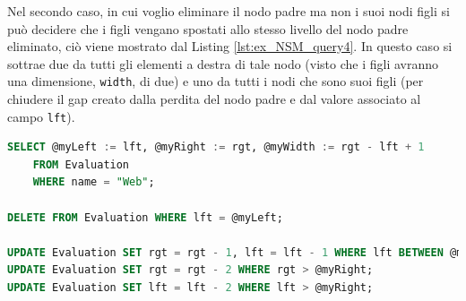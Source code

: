 %
Nel secondo caso, in cui voglio eliminare il nodo padre ma non i suoi nodi figli si può decidere che i figli vengano spostati allo stesso livello del 
nodo padre eliminato, ciò viene mostrato dal Listing \ref{lst:ex_NSM_query4}. In questo caso si sottrae due da tutti gli elementi a destra di tale nodo 
(visto che i figli avranno una dimensione, \texttt{width}, di due) e uno da tutti i nodi che sono suoi figli (per chiudere il gap creato dalla perdita 
del nodo padre e dal valore associato al campo \texttt{lft}).
\begin{lstlisting}[language=SQL, label=lst:ex_NSM_query4, caption={Query in puro Sql per eliminare un nodo padre dalla tassonomia delle Evaluation, 
    secondo il Nested Set Model.}]
SELECT @myLeft := lft, @myRight := rgt, @myWidth := rgt - lft + 1
    FROM Evaluation
    WHERE name = "Web";

DELETE FROM Evaluation WHERE lft = @myLeft;

UPDATE Evaluation SET rgt = rgt - 1, lft = lft - 1 WHERE lft BETWEEN @myLeft AND @myRight;
UPDATE Evaluation SET rgt = rgt - 2 WHERE rgt > @myRight;
UPDATE Evaluation SET lft = lft - 2 WHERE lft > @myRight;
\end{lstlisting}
%
\newpage
%
